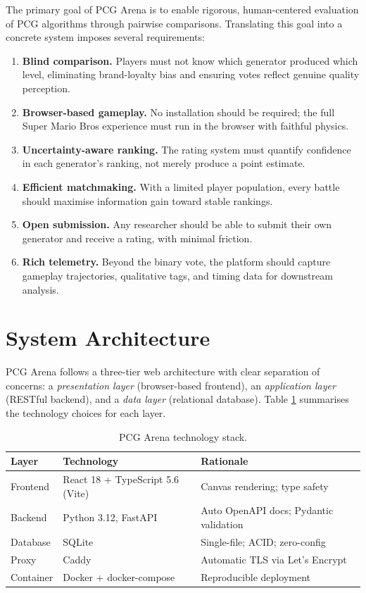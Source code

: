 \documentclass[shortabstract, mgr, english]{iithesis}
\begin{document}
The primary goal of PCG Arena is to enable rigorous, human-centered evaluation of PCG
algorithms through pairwise comparisons. Translating this goal into a concrete system
imposes several requirements:

\begin{enumerate}
    \item \textbf{Blind comparison.} Players must not know which generator produced which
          level, eliminating brand-loyalty bias and ensuring votes reflect genuine quality
          perception.
    \item \textbf{Browser-based gameplay.} No installation should be required; the full
          Super Mario Bros experience must run in the browser with faithful physics.
    \item \textbf{Uncertainty-aware ranking.} The rating system must quantify confidence
          in each generator's ranking, not merely produce a point estimate.
    \item \textbf{Efficient matchmaking.} With a limited player population, every battle
          should maximise information gain toward stable rankings.
    \item \textbf{Open submission.} Any researcher should be able to submit their own
          generator and receive a rating, with minimal friction.
    \item \textbf{Rich telemetry.} Beyond the binary vote, the platform should capture
          gameplay trajectories, qualitative tags, and timing data for downstream analysis.
\end{enumerate}

\section{System Architecture}
\label{sec:sd-architecture}

PCG Arena follows a three-tier web architecture with clear separation of concerns:
a \emph{presentation layer} (browser-based frontend), an \emph{application layer}
(RESTful backend), and a \emph{data layer} (relational database). Table \ref{tab:tech-stack}
summarises the technology choices for each layer.

\begin{table}[H]
\centering
\begin{tabular}{lll}
\toprule
\textbf{Layer} & \textbf{Technology} & \textbf{Rationale} \\
\midrule
Frontend  & React 18 + TypeScript 5.6 (Vite) & Canvas rendering; type safety \\
Backend   & Python 3.12, FastAPI              & Auto OpenAPI docs; Pydantic validation \\
Database  & SQLite                            & Single-file; ACID; zero-config \\
Proxy     & Caddy                             & Automatic TLS via Let's Encrypt \\
Container & Docker + docker-compose           & Reproducible deployment \\
\bottomrule
\end{tabular}
\caption{PCG Arena technology stack.}
\label{tab:tech-stack}
\end{table}
\end{document}
